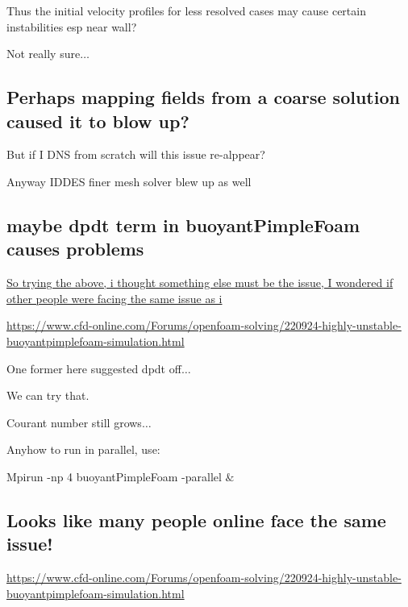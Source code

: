 \documentclass[12pt]{article}
\renewcommand{\_}{\kern-1.5pt\textunderscore\kern-1.5pt}
\begin{document}
Thus the initial velocity profiles for less resolved cases may cause certain instabilities esp near wall?\par

Not really sure$ \ldots $ \par
\subsection{Perhaps mapping fields from a coarse solution caused it to blow up?}
But if I DNS from scratch will this issue re-alppear?\par

Anyway IDDES finer mesh solver blew up as well\par

\subsection{maybe dpdt term in buoyantPimpleFoam causes problems}
\uline{So trying the above, i thought something else must be the issue, I wondered if other people were facing the same issue as i}\par
\href{https://www.cfd-online.com/Forums/openfoam-solving/220924-highly-unstable-buoyantpimplefoam-simulation.html}{https://www.cfd-online.com/Forums/openfoam-solving/220924-highly-unstable-buoyantpimplefoam-simulation.html}\par

One former here suggested dpdt off$ \ldots $ \par

We can try that.\par

Courant number still grows$ \ldots $ \par


\vspace{\baselineskip}
Anyhow to run in parallel, use:\par

Mpirun -np 4 buoyantPimpleFoam -parallel $\&$ \par

\subsection{Looks like many people online face the same issue!}
\href{https://www.cfd-online.com/Forums/openfoam-solving/220924-highly-unstable-buoyantpimplefoam-simulation.html}{https://www.cfd-online.com/Forums/openfoam-solving/220924-highly-unstable-buoyantpimplefoam-simulation.html}\par
\end{document}
